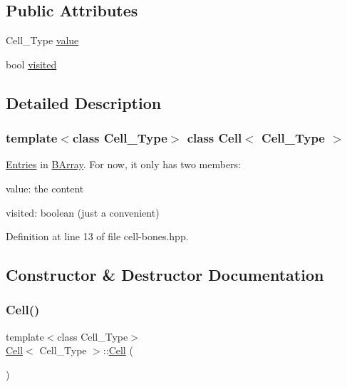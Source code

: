 \subsection*{Public Attributes}
\begin{DoxyCompactItemize}
\item 
Cell\+\_\+\+Type \hyperlink{class_cell_a5df1609bc0705830ec4dc6e177ddc955}{value}
\item 
bool \hyperlink{class_cell_a1f539a05953fa05d723c32e718f0eeb3}{visited}
\end{DoxyCompactItemize}


\subsection{Detailed Description}
\subsubsection*{template$<$class Cell\+\_\+\+Type$>$\newline
class Cell$<$ Cell\+\_\+\+Type $>$}

\hyperlink{class_entries}{Entries} in \hyperlink{class_b_array}{B\+Array}. For now, it only has two members\+: 


\begin{DoxyItemize}
\item value\+: the content
\item visited\+: boolean (just a convenient) 
\end{DoxyItemize}

Definition at line 13 of file cell-\/bones.\+hpp.



\subsection{Constructor \& Destructor Documentation}
\mbox{\label{class_cell_a402912c21a4c87659c0576a4bfa3c48f}} 
\subsubsection{\texorpdfstring{Cell()}{Cell()}\hspace{0.1cm}{\footnotesize\ttfamily [1/13]}}
{\footnotesize\ttfamily template$<$class Cell\+\_\+\+Type$>$ \\
\hyperlink{class_cell}{Cell}$<$ Cell\+\_\+\+Type $>$\+::\hyperlink{class_cell}{Cell} (\begin{DoxyParamCaption}{ }\end{DoxyParamCaption})}

